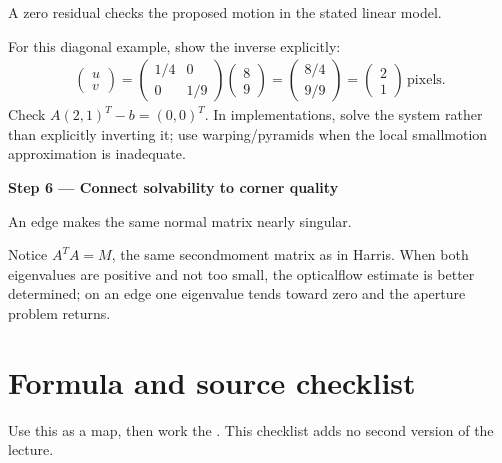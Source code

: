 \documentclass[letterpaper,11pt,english,openany,oneside]{jupyterBook}
\begin{document}
\sphinxAtStartPar
{} A zero residual checks the proposed motion in the stated linear model.

\sphinxAtStartPar
For this diagonal example, show the inverse explicitly:
{\color{QuizMathBlue} \begin{equation*}
\begin{split}
\begin{pmatrix}u\\v\end{pmatrix}
=\begin{pmatrix}1/4&0\\0&1/9\end{pmatrix}\begin{pmatrix}8\\9\end{pmatrix}
=\begin{pmatrix}8/4\\9/9\end{pmatrix}=\begin{pmatrix}2\\1\end{pmatrix}\,\mathrm{pixels}.
\end{split}
\end{equation*}}
\sphinxAtStartPar
Check {\color{QuizMathBlue} \(A(2,1)^T-b=(0,0)^T\)}. In implementations, solve the system rather than explicitly inverting it; use warping/pyramids when the local small\sphinxhyphen{}motion approximation is inadequate.

\par

\par\medskip{}
{\color{QuizStepRed}\bfseries Step 6 — Connect solvability to corner quality}\par\smallskip

\sphinxAtStartPar
{} An edge makes the same normal matrix nearly singular.

\sphinxAtStartPar
Notice {\color{QuizMathBlue} \(A^TA=M\)}, the same second\sphinxhyphen{}moment matrix as in Harris. When both eigenvalues are positive and not too small, the optical\sphinxhyphen{}flow estimate is better determined; on an edge one eigenvalue tends toward zero and the aperture problem returns.

\par

\sphinxstepscope


\section{Formula and source checklist}
\label{\detokenize{lectures/lecture05/review:formula-and-source-checklist}}\label{\detokenize{lectures/lecture05/review:lec05-review}}\label{\detokenize{lectures/lecture05/review::doc}}
\sphinxAtStartPar
Use this as a map, then work the {\hyperref[\detokenize{lectures/lecture05/quiz-workbook::doc}]{}}. This checklist adds no second version of the lecture.
\end{document}
